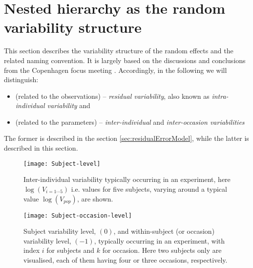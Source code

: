 \section{Nested hierarchy as the random variability structure}
\label{sec:variabilityModel}
\label{math:variability}

This section describes the variability structure of the random effects and the related naming convention. It is largely based on the discussions and conclusions from the Copenhagen focus meeting \cite{Copenhagen:2013}. Accordingly, in the following we will distinguish: 
\begin{itemize}
\item
(related to the observations) -- \textit{residual variability}, also known as \textit{intra-individual variability} and
\item
(related to the parameters) -- \textit{inter-individual} and \textit{inter-occasion variabilities}
\end{itemize}
The former is described in the section \ref{sec:residualErrorModel}, while the latter is described in this section.

\begin{figure}[htb!]
\centering
  \texttt{[image: Subject-level]}
 \caption{Inter-individual variability typically occurring in an experiment, here $\log(V_{i=1\cdots5})$ i.e. values for five subjects, varying around a typical value $\log(V_{pop})$, are shown.}
 \label{fig:subjectLevelVariability}
\end{figure}

\begin{figure}[htb!]
\centering
  \texttt{[image: Subject-occasion-level]}
 \caption{Subject variability level, $(0)$, and within-subject (or occasion) variability level, $(-1)$, typically occurring in an experiment, with index $i$ for subjects and $k$ for occasion. Here two subjects only are visualised, each of them having four or three occasions, respectively.}
 \label{fig:subjectOccasionLevelVariability}
\end{figure}

